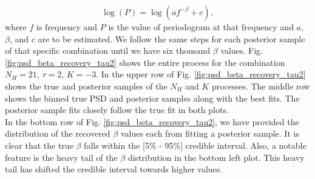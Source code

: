 \documentclass{aa}
\begin{document}
\begin{equation}
\label{eq:periodogram_fit}
    \log(P) = \log\left(a f^{-\beta} + c\right),
\end{equation}
where $f$ is frequency and $P$ is the value of periodogram at that frequency and $a$, $\beta$, and $c$ are to be estimated. We follow the same steps for each posterior sample of that specific combination until we have six thousand $\beta$ values. Fig. \ref{fig:psd_beta_recovery_tau2} shows the entire process for the combination $N_H = 21$, $\tau = 2$, $K = -3$. In the upper row of Fig. \ref{fig:psd_beta_recovery_tau2} shows the true and posterior samples of the $N_H$ and $K$ processes. The middle row shows the binned true PSD and posterior samples along with the best fits. The posterior sample fits closely follow the true fit in both plots. \\
In the bottom row of Fig. \ref{fig:psd_beta_recovery_tau2}, we have provided the distribution of the recovered $\beta$ values each from fitting a posterior sample. It is clear that the true $\beta$ falls within the [5\% - 95\%] credible interval. Also, a notable feature is the heavy tail of the $\beta$ distribution in the bottom left plot. This heavy tail has shifted the credible interval towards higher values. \\
\end{document}
